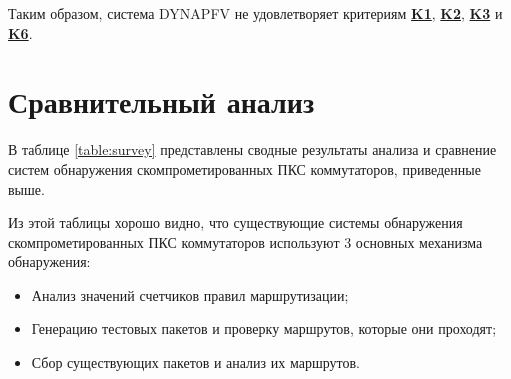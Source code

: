 \documentclass[../thesis.tex]{subfiles}
\begin{document}
{
\hypersetup{linkcolor=black}

Таким образом, система DYNAPFV не удовлетворяет критериям \hyperref[criterion:K1]{\textbf{K1}}, \hyperref[criterion:K2]{\textbf{K2}}, \hyperref[criterion:K3]{\textbf{K3}} и \hyperref[criterion:K6]{\textbf{K6}}.
}

\pagebreak
\section{Сравнительный анализ}

В таблице \ref{table:survey} представлены сводные результаты анализа и сравнение систем обнаружения скомпрометированных ПКС коммутаторов, приведенные выше.

Из этой таблицы хорошо видно, что существующие системы обнаружения скомпрометированных ПКС коммутаторов используют 3 основных механизма обнаружения:
\begin{itemize}
\item Анализ значений счетчиков правил маршрутизации;
\item Генерацию тестовых пакетов и проверку маршрутов, которые они проходят;
\item Сбор существующих пакетов и анализ их маршрутов.
\end{itemize}
\end{document}
